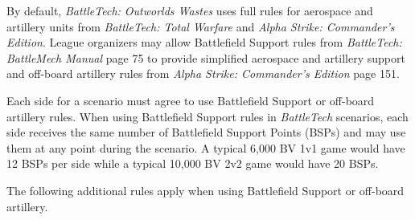 By default, \emph{BattleTech: Outworlds Wastes} uses full rules for aerospace and artillery units from \emph{BattleTech: Total Warfare} and \emph{Alpha Strike: Commander's Edition}.
League organizers may allow Battlefield Support rules from \emph{BattleTech: BattleMech Manual} page 75 to provide simplified aerospace and artillery support and off-board artillery rules from \emph{Alpha Strike: Commander's Edition} page 151.

Each side for a scenario must agree to use Battlefield Support or off-board artillery rules.
When using Battlefield Support rules in \emph{BattleTech} scenarios, each side receives the same number of Battlefield Support Points (BSPs) and may use them at any point during the scenario.
A typical 6,000 BV 1v1 game would have 12 BSPs per side while a typical 10,000 BV 2v2 game would have 20 BSPs.

The following additional rules apply when using Battlefield Support or off-board artillery.

